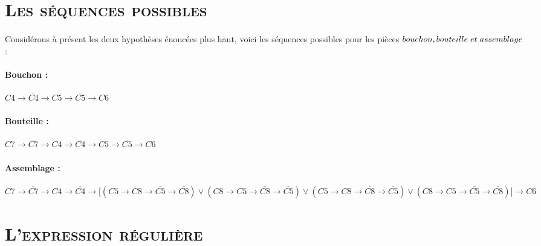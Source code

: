 	\section{\textsc{Les séquences possibles}}
	
		\paragraph{}
		Considérons à présent les deux hypothèses énoncées plus haut, voici les séquences possibles pour les pièces $bouchon, bouteille \hspace{1mm} et \hspace{1mm}  assemblage$ :
		\paragraph{Bouchon :}
		$C4 \rightarrow \overline{C4} \rightarrow C5 \rightarrow \overline{C5} \rightarrow C6$
		\paragraph{Bouteille :}
		$C7 \rightarrow \overline{C7} \rightarrow C4 \rightarrow \overline{C4} \rightarrow C5 \rightarrow 
		\overline{C5} \rightarrow C6$
		\paragraph{Assemblage :}
		$C7 \rightarrow \overline{C7} \rightarrow C4 \rightarrow \overline{C4} \rightarrow   \textbf{[} ( C5 \rightarrow 
		C8 \rightarrow \overline{C5} \rightarrow \overline{C8}) \vee (C8 \rightarrow 
		C5 \rightarrow \overline{C8} \rightarrow \overline{C5}) \vee (C5 \rightarrow 
		C8 \rightarrow \overline{C8} \rightarrow \overline{C5}) \vee ( C8 \rightarrow 
		C5 \rightarrow \overline{C5} \rightarrow \overline{C8} )\textbf{]} \rightarrow C6$
				
		\section{\textsc{L'expression régulière}}
		
